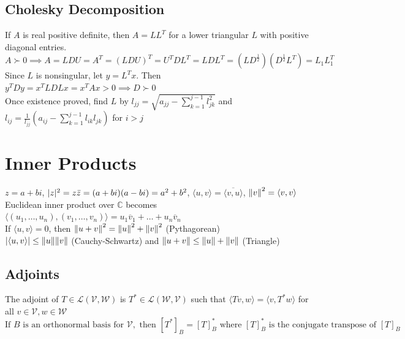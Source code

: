 \documentclass{article}
\DeclarePairedDelimiter\abs{\lvert}{\rvert}%
\DeclarePairedDelimiter\norm{\lVert}{\rVert}%
\newcommand{\C}{\mathbb{C}}
\newcommand{\linear}{\mathcal{L}}
\newcommand{\V}{\mathcal{V}}
\newcommand{\W}{\mathcal{W}}
\newcommand\inner[2]{\langle #1, #2 \rangle}
\begin{document}
\subsection{Cholesky Decomposition}
If $A$ is real positive definite, then $A = LL^T$ for a lower triangular $L$ with positive diagonal entries. \\
$A \succ 0 \implies A = LDU = A^T = (LDU)^T = U^TDL^T = LDL^T = (LD^{\frac{1}{2}})(D^{\frac{1}{2}} L^T) = L_1L_1^T$ \\
Since $L$ is nonsingular, let $y = L^Tx$. Then $y^TDy = x^TLDLx = x^TAx > 0 \implies D \succ 0$ \\
Once existence proved, find $L$ by $l_{jj} = \sqrt{a_{jj} - \sum_{k=1}^{j-1}l_{jk}^2}$ and $l_{ij} = \frac{1}{l_{jj}}(a_{ij} - \sum_{k=1}^{j-1}l_{ik}l_{jk})$ for $i > j$

\section{Inner Products}
$z = a + bi$, $\abs z^2 =  z \bar{z} = (a+bi)(a-bi) = a^2 + b^2$, $\inner u v  = \overline{\inner v u}$, ${\norm v}^2 = \inner v v$ \\
Euclidean inner product over $\C$ becomes $\inner {(u_1, \ldots, u_n)} {(v_1, \ldots, v_n)} = u_1 \overline{v}_1 + \ldots + u_n \overline{v}_n$ \\
If $\inner u v = 0$, then ${\norm {u + v}}^2 = {\norm u }^2 + {\norm v}^2$ (Pythagorean) \\
$\abs {\inner u v} \leq \norm u \norm v$ (Cauchy-Schwartz) and $\norm{u + v} \leq \norm u + \norm v$ (Triangle)

\subsection{Adjoints}
The adjoint of $T \in \linear(\V, \W)$ is $T^* \in \linear(\W, \V)$ such that $\inner{Tv}{w} = \inner{v}{T^*w}$ for all $v \in \V, w \in \W$ \\
$\mbox{If } B \mbox { is an orthonormal basis for }\V, \mbox{ then }[T^*]_B = [T]_B^* \mbox{ where } [T]_B^* \mbox{ is the conjugate transpose of } [T]_B$
\end{document}
